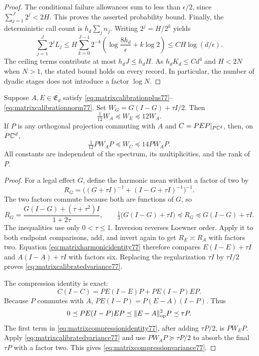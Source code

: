 \begin{proof}
The conditional failure allowances sum to less than $\epsilon/2$,
since $\sum_{j=1}^J2^j<2H$.  This proves the asserted probability
bound.  Finally, the deterministic call count is $h_d\sum_j n_j$.
Writing $2^j=H/2^k$ yields
\[
 \sum_{j=1}^J2^jL_j
 \le H\sum_{k=0}^{J-1}2^{-k}
       \left(\log\frac{8h_d}{\epsilon}+k\log2\right)
 \le CH\log(d/\epsilon).
\]
The ceiling terms contribute at most $h_dJ\le h_dH$.
As $h_dK_d\le Cd^4$ and $H<2N$ when $N>1$, the stated bound
holds on every record.  In particular, the number of dyadic stages
does not introduce a factor $\log N$.
\end{proof}

\begin{lemma}
\label{lem:matrixcompression77}
Suppose $A,E\in\mathfrak E_d$ satisfy
\eqref{eq:matrixcalibrationplus77}--\eqref{eq:matrixcalibrationnorm77}.
Set $W_G=G(I-G)+\tau I/2$.  Then
\begin{equation}\label{eq:matrixcalibratedvariance77}
 \tfrac1{12}W_A\preceq W_E\preceq12W_A.
\end{equation}
If $P$ is any orthogonal projection commuting with $A$ and
$C=PEP|_{P\mathbb C^d}$, then, on $P\mathbb C^d$,
\begin{equation}\label{eq:matrixcompressionvariance77}
 \tfrac1{12}PW_AP\preceq W_C\preceq14PW_AP.
\end{equation}
All constants are independent of the spectrum, its multiplicities,
and the rank of $P$.
\end{lemma}
\begin{proof}
For a legal effect $G$, define the harmonic mean without a factor
of two by
\[
 R_G=\bigl((G+\tau I)^{-1}+(I-G+\tau I)^{-1}\bigr)^{-1}.
\]
The two factors commute because both are functions of $G$, so
\begin{equation}\label{eq:matrixharmonicidentity77}
 R_G=\frac{G(I-G)+(\tau+\tau^2)I}{1+2\tau},
 \qquad
 \tfrac13\bigl(G(I-G)+\tau I\bigr)
       \preceq R_G\preceq G(I-G)+\tau I.
\end{equation}
The inequalities use only $0<\tau\le1$.
Inversion reverses Loewner order.  Apply it to both endpoint
comparisons, add, and invert again to get
$R_E\asymp R_A$ with factors two.  Equation
\eqref{eq:matrixharmonicidentity77} therefore compares
$E(I-E)+\tau I$ and $A(I-A)+\tau I$ with factors six.
Replacing the regularization $\tau I$ by $\tau I/2$ proves
\eqref{eq:matrixcalibratedvariance77}.

The compression identity is exact:
\begin{equation}\label{eq:matrixcompressionidentity77}
 C(I-C)=PE(I-E)P+PE(I-P)EP.
\end{equation}
Because $P$ commutes with $A$,
$PE(I-P)=P(E-A)(I-P)$.  Thus
\[
 0\preceq PE(I-P)EP
       \preceq\|E-A\|_{\rm op}^2P\preceq\tau P.
\]
The first term in \eqref{eq:matrixcompressionidentity77}, after
adding $\tau P/2$, is $PW_EP$.  Apply
\eqref{eq:matrixcalibratedvariance77} and use
$PW_AP\succeq\tau P/2$ to absorb the final $\tau P$ with a
factor two.  This gives \eqref{eq:matrixcompressionvariance77}.
\end{proof}

